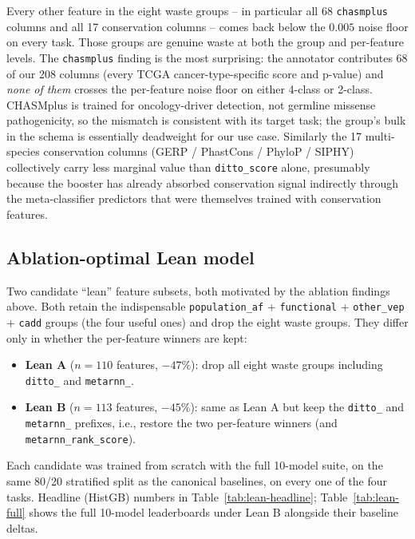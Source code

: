 \documentclass[11pt,a4paper]{article}
\begin{document}
Every other feature in the eight waste groups -- in particular all 68
\texttt{chasmplus} columns and all 17 conservation columns -- comes
back below the $0.005$ noise floor on every task. Those groups are
genuine waste at both the group and per-feature levels. The
\texttt{chasmplus} finding is the most surprising: the annotator
contributes 68 of our 208 columns (every TCGA cancer-type-specific
score and p-value) and \emph{none of them} crosses the per-feature
noise floor on either 4-class or 2-class. CHASMplus is trained for
oncology-driver detection, not germline missense pathogenicity, so the
mismatch is consistent with its target task; the group's bulk in the
schema is essentially deadweight for our use case. Similarly the 17
multi-species conservation columns (GERP / PhastCons / PhyloP / SIPHY)
collectively carry less marginal value than \texttt{ditto\_score}
alone, presumably because the booster has already absorbed conservation
signal indirectly through the meta-classifier predictors that were
themselves trained with conservation features.

\subsection{Ablation-optimal Lean model}
\label{sec:lean}

Two candidate ``lean'' feature subsets, both motivated by the ablation
findings above. Both retain the indispensable
\texttt{population\_af} + \texttt{functional} + \texttt{other\_vep} +
\texttt{cadd} groups (the four useful ones) and drop the eight waste
groups. They differ only in whether the per-feature winners are kept:

\begin{itemize}[leftmargin=*]
 \item \textbf{Lean A} ($n=110$ features, $-47\%$): drop all eight
 waste groups including \texttt{ditto\_} and \texttt{metarnn\_}.
 \item \textbf{Lean B} ($n=113$ features, $-45\%$): same as Lean A
 but keep the \texttt{ditto\_} and \texttt{metarnn\_} prefixes,
 i.e., restore the two per-feature winners (and \texttt{metarnn\_rank\_score}).
\end{itemize}

Each candidate was trained from scratch with the full 10-model suite,
on the same 80/20 stratified split as the canonical baselines, on every
one of the four tasks. Headline (HistGB) numbers in
Table~\ref{tab:lean-headline}; Table~\ref{tab:lean-full} shows the full
10-model leaderboards under Lean B alongside their baseline deltas.
\end{document}
